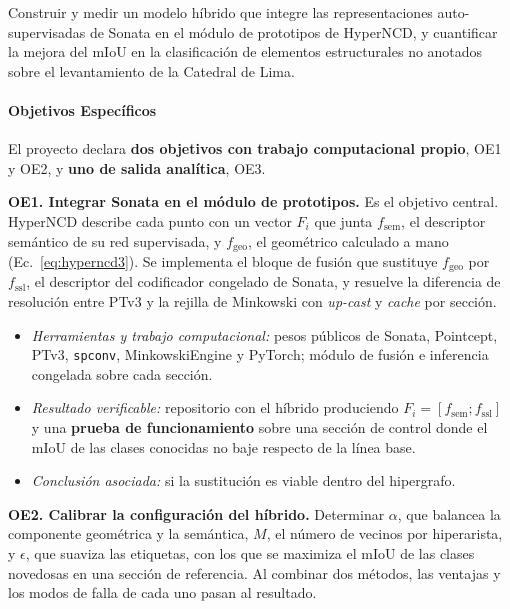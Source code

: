 Construir y medir un modelo híbrido que integre las representaciones
auto-supervisadas de Sonata en el módulo de prototipos de HyperNCD, y cuantificar
la mejora del mIoU en la clasificación de elementos estructurales no anotados
sobre el levantamiento de la Catedral de Lima.

\paragraph*{Objetivos Específicos}

El proyecto declara \textbf{dos objetivos con trabajo computacional propio}, OE1
y OE2, y \textbf{uno de salida analítica}, OE3.

\medskip
\noindent\textbf{OE1. Integrar Sonata en el módulo de prototipos.} Es el objetivo central. HyperNCD describe cada punto con un vector $F_i$ que
junta $f_{\mathrm{sem}}$, el descriptor semántico de su red supervisada, y
$f_{\mathrm{geo}}$, el geométrico calculado a mano (Ec.~\eqref{eq:hyperncd3}). Se
implementa el bloque de fusión que sustituye $f_{\mathrm{geo}}$ por
$f_{\mathrm{ssl}}$, el descriptor del codificador congelado de Sonata, y resuelve
la diferencia de resolución entre PTv3 y la rejilla de Minkowski con
\emph{up-cast} y \emph{cache} por sección.

\begin{itemize}\setlength{\itemsep}{0pt}
\item \textit{Herramientas y trabajo computacional:} pesos públicos de Sonata,
Pointcept, PTv3, \texttt{spconv}, MinkowskiEngine y PyTorch; módulo de fusión e
inferencia congelada sobre cada sección.
\item \textit{Resultado verificable:} repositorio con el híbrido produciendo
$F_i=[f_{\mathrm{sem}};f_{\mathrm{ssl}}]$ y una \textbf{prueba de
funcionamiento} sobre una sección de control donde el mIoU de las clases
conocidas no baje respecto de la línea base.
\item \textit{Conclusión asociada:} si la sustitución es viable dentro del
hipergrafo.
\end{itemize}

\medskip
\noindent\textbf{OE2. Calibrar la configuración del híbrido.} Determinar $\alpha$, que balancea la componente geométrica y la semántica, $M$,
el número de vecinos por hiperarista, y $\epsilon$, que suaviza las etiquetas, con
los que se maximiza el mIoU de las clases novedosas en una sección de referencia.
Al combinar dos métodos, las ventajas y los modos de falla de cada uno pasan al
resultado.

